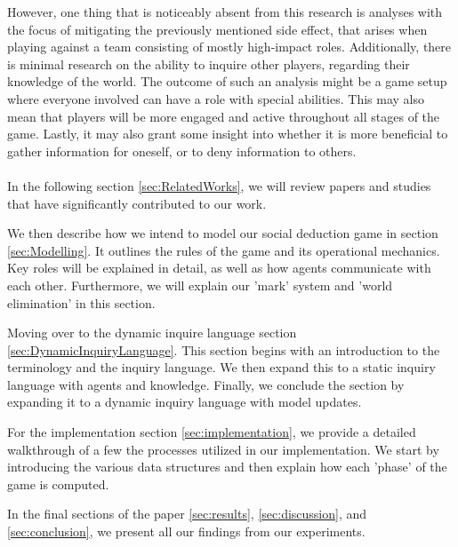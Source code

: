 However, one thing that is noticeably absent from this research is analyses
with the focus of mitigating the previously mentioned side effect, that arises
when playing against a team consisting of mostly high-impact roles.
Additionally, there is minimal research on the ability to inquire other
players, regarding their knowledge of the world. The outcome of such an
analysis might be a game setup where everyone involved can have a role with
special abilities. This may also mean that players will be more engaged and
active throughout all stages of the game. Lastly, it may also grant some
insight into whether it is more beneficial to gather information for oneself,
or to deny information to others.\\ \\

In the following section \ref{sec:RelatedWorks}, we will review papers and
studies that have significantly contributed to our work.

We then describe how we intend to model our social deduction game in section
\ref{sec:Modelling}. It outlines the rules of the game and its operational
mechanics. Key roles will be explained in detail, as well as how agents
communicate with each other. Furthermore, we will explain our 'mark' system and
'world elimination' in this section.

Moving over to the dynamic inquire language section
\ref{sec:DynamicInquiryLanguage}. This section begins with an introduction to
the terminology and the inquiry language. We then expand this to a static
inquiry language with agents and knowledge. Finally, we conclude the section by
expanding it to a dynamic inquiry language with model updates.

For the implementation section \ref{sec:implementation}, we provide a detailed
walkthrough of a few the processes utilized in our implementation. We start by
introducing the various data structures and then explain how each 'phase' of
the game is computed.

In the final sections of the paper \ref{sec:results}, \ref{sec:discussion}, and
\ref{sec:conclusion}, we present all our findings from our experiments.